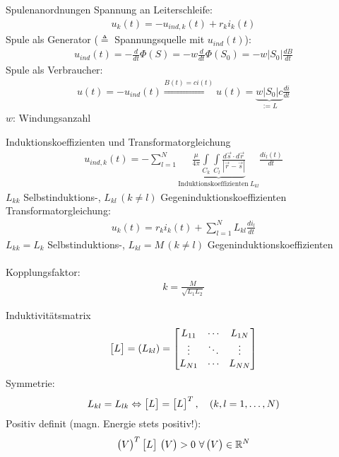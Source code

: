 \documentclass[a6paper]{kartei}
\begin{document}
\begin{karte}{Spulenanordnungen}
Spannung an Leiterschleife:
\begin{align}
u_{k}(t) = -u_{ind,k}(t) + r_{k}i_{k}(t)
\end{align}
Spule als Generator ($\triangleq$ Spannungsquelle mit $u_{ind}(t)$):
\begin{align}
u_{ind}(t) = - \frac{d}{dt} \Phi(S) = - w \frac{d}{dt} \Phi(S_{0}) = -w |S_{0}| \frac{dB}{dt}
\end{align}
Spule als Verbraucher:
\begin{align}
u(t) = -u_{ind}(t) \stackrel{B(t) = c i(t)}{\Longrightarrow} u(t) = \underbrace{w|S_{0}|c}_{:= L} \frac{di}{dt}
\end{align}
$w$: Windungsanzahl
\end{karte}

\begin{karte}{Induktionskoeffizienten und Transformatorgleichung}
\begin{align}
u_{ind,k}(t) = - \sum \limits_{l=1}^{N} \underbrace{\frac{\mu}{4\pi} \int \limits_{C_{k}} \int \limits_{C_{l}} \frac{d\vec{s} \cdot d\vec{r}}{|\vec{r}-\vec{s}|}}_{\text{Induktionskoeffizienten} \ L_{kl}}  \frac{di_{l}(t)}{dt}
\end{align}
$L_{kk}$ Selbstinduktions-, $L_{kl} \, (k \neq l)$ Gegeninduktionskoeffizienten \\
Transformatorgleichung:
\begin{align}
u_{k}(t) = r_{k}i_{k}(t) + \sum \limits_{l=1}^{N} L_{kl} \frac{di_{l}}{dt}
\end{align}
$L_{kk} = L_{k} $ Selbstinduktions-, $L_{kl} = M \, (k \neq l)$ Gegeninduktionskoeffizienten \\
\\
Kopplungsfaktor:
\begin{align}
k = \frac{M}{\sqrt{L_{1}L_{2}}}
\end{align}
\end{karte}

\begin{karte}{Induktivitätsmatrix}
\begin{eqnarray*}
\begin{bmatrix} L \end{bmatrix} = (L_{kl}) = \begin{bmatrix} L_{11} & \cdots & L_{1N} \\ \vdots & \ddots & \vdots \\ L_{N1} & \cdots & L_{NN} \end{bmatrix}
\end{eqnarray*}
Symmetrie:
\begin{eqnarray*}
L_{kl} = L_{lk} \Leftrightarrow \begin{bmatrix} L \end{bmatrix} = \begin{bmatrix} L \end{bmatrix}^{T}, \quad (k,l = 1, \dots, N)
\end{eqnarray*}
Positiv definit (magn. Energie stets positiv!):
\begin{eqnarray*}
 \begin{pmatrix} V \end{pmatrix}^{T} \begin{bmatrix} L \end{bmatrix}  \, \begin{pmatrix} V \end{pmatrix} > 0 \ \forall \begin{pmatrix} V \end{pmatrix} \in \mathbb{R}^{N}
\end{eqnarray*}
\end{karte}
\end{document}
